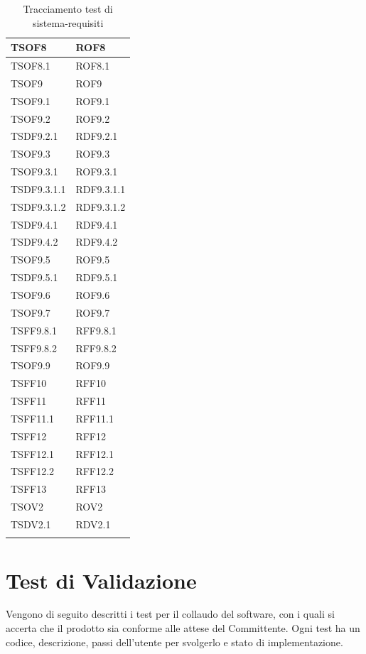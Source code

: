 \documentclass[openany,12pt,a4paper]{report}
\begin{document}
\begin{longtable}{| p{4cm} |p{4cm}  |}
	\hline
	 TSOF8&ROF8
	\\[1em]
	\hline
	 TSOF8.1&ROF8.1
	\\[1em]
	\hline
	 TSOF9&ROF9
	\\[1em]
	\hline
	 TSOF9.1&ROF9.1
	\\[1em]
	\hline
	 TSOF9.2&ROF9.2
	\\[1em]
	\hline
	 TSDF9.2.1&RDF9.2.1
	\\[1em]
	\hline
	 TSOF9.3&ROF9.3
	\\[1em]
	\hline
	 TSOF9.3.1&ROF9.3.1
	\\[1em]
	\hline
	 TSDF9.3.1.1&RDF9.3.1.1
	\\[1em]
	\hline
	 TSDF9.3.1.2&RDF9.3.1.2
	\\[1em]
	\hline
	 TSDF9.4.1&RDF9.4.1
	\\[1em]
	\hline
	 TSDF9.4.2&RDF9.4.2
	\\[1em]
	\hline
	 TSOF9.5&ROF9.5
	\\[1em]
	\hline
	 TSDF9.5.1&RDF9.5.1
	\\[1em]
	\hline
	 TSOF9.6&ROF9.6
	\\[1em]
	\hline
	 TSOF9.7&ROF9.7
	\\[1em]
	\hline
	 TSFF9.8.1&RFF9.8.1
	\\[1em]
	\hline
	 TSFF9.8.2&RFF9.8.2
	\\[1em]
	\hline
	 TSOF9.9&ROF9.9
	\\[1em]
	\hline	
	 TSFF10&RFF10
	\\[1em]
	\hline
	 TSFF11&RFF11
	\\[1em]
	\hline
	 TSFF11.1&RFF11.1
	\\[1em]
	\hline
	 TSFF12&RFF12
	\\[1em]
	\hline
	 TSFF12.1&RFF12.1
	\\[1em]
	\hline
	 TSFF12.2&RFF12.2
	\\[1em]
	\hline
	TSFF13&RFF13
	\\[1em]
	\hline
	TSOV2&ROV2
	\\[1em]
	\hline
	TSDV2.1&RDV2.1
	\\[1em]
	\hline
\caption{Tracciamento test di sistema-requisiti}
\end{longtable}

\section{Test di Validazione}

Vengono di seguito descritti i test per il collaudo del software, con i quali si accerta che il prodotto sia conforme alle attese del Committente. Ogni test ha un codice, descrizione, passi dell'utente per svolgerlo e stato di implementazione.
\end{document}
